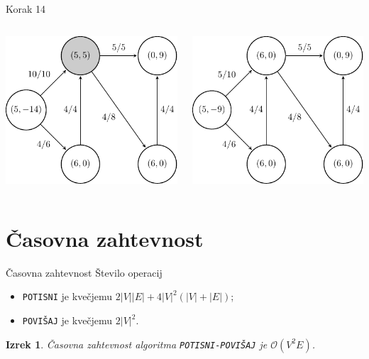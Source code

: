 \documentclass{beamer}
\newtheorem{thm}{Izrek}
\begin{document}
\begin{frame}{Korak 14}
    \begin{columns}
        \begin{column}{0.5\textwidth}
            \centering
            \includegraphics[scale=0.7]{../writing/images/graf2-15.pdf}
        \end{column}

        \begin{column}{0.5\textwidth}
            \centering
            \includegraphics[scale=0.7]{../writing/images/graf2-16.pdf}
        \end{column}
    \end{columns}
\end{frame}

\section{Časovna zahtevnost}
\begin{frame}{Časovna zahtevnost}
    Število operacij
    \begin{itemize}
        \item \texttt{POTISNI} je kvečjemu $2|V||E| + 4|V|^2 (|V| + |E|)$;
        \item \texttt{POVIŠAJ} je kvečjemu $2|V|^2$.
    \end{itemize}
    \pause
    \begin{thm}
        Časovna zahtevnost algoritma \texttt{POTISNI-POVIŠAJ} je $\mathcal{O}(V^2E)$.
    \end{thm}
\end{frame}
\end{document}
